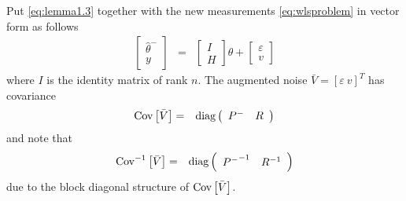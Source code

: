 \begin{lemma}
	Put \eqref{eq:lemma1.3} together with the new measurements \eqref{eq:wlsproblem} in vector form as follows
	\begin{eqnarray}
		\left[\begin{array}{cc}
			\hat{\theta}^- \\ y
		\end{array}\right] &=& \left[\begin{array}{c}
			I \\ H
		\end{array}\right]\theta + \left[\begin{array}{cc}
			\varepsilon \\ v
		\end{array}\right] \label{eq:lemma1.4}
	\end{eqnarray}
	where $I$ is the identity matrix of rank $n$. The augmented noise $\bar{V}=[\varepsilon ~ v]^T$ has covariance
	\begin{eqnarray}
		\textup{Cov}\left[\bar{V}\right] &=& \textup{diag}\left(\begin{array}{cc}
			P^- & R
		\end{array}\right) \nonumber
	\end{eqnarray}
	and note that
	\begin{eqnarray}
		\textup{Cov}^{-1}\left[\bar{V}\right] &=& \textup{diag}\left(\begin{array}{cc}
			{P^-}^{-1} & R^{-1}
		\end{array}\right) \nonumber
	\end{eqnarray}
	due to the block diagonal structure of $\textup{Cov}\left[\bar{V}\right]$.
	

\end{lemma}
